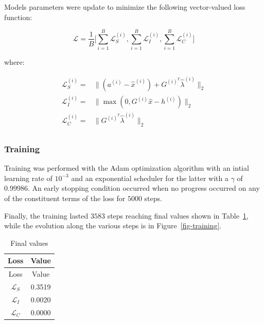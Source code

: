 \documentclass[
]{article}
\begin{document}
Models parameters were update to minimize the following vector-valued
loss function:

\begin{equation}
\mathcal{L} = \frac{1}{B}\biggr[\sum_{i=1}^B\mathcal{L}_{S}^{(i)}, \sum_{i=1}^B\mathcal{L}_{I}^{(i)}, \sum_{i=1}^B\mathcal{L}_{C}^{(i)}\biggr] 
\end{equation}

where:

\begin{align}
    \mathcal{L}_S^{(i)} =& \|(a^{(i)}-\hat{x}^{(i)}) + G^{(i)^{T}}\hat\lambda^{(i)}\|_2\\ 
    \mathcal{L}_{I}^{(i)}  =& \|\max(0, G^{(i)}\hat{x} - h^{(i)})\|_2\\
    \mathcal{L}_{C}^{(i)}  =& \|G^{(i)^{T}}\hat\lambda^{(i)}\|_2\\
\end{align}

\subsubsection{Training}\label{training}

Training was performed with the Adam optimization algorithm with an
intial learning rate of \(10^{-3}\) and an exponential scheduler for the
latter with a \(\gamma\) of \(0.99986\). An early stopping condition
occurred when no progress occurred on any of the constituent terms of
the loss for \(5000\) steps.

Finally, the training lasted \(3583\) steps reaching final values shown
in Table~\ref{tbl-training}, while the evolution along the various steps
is in Figure~\ref{fig-training}.

\begin{longtable}[]{@{}cc@{}}
\caption{Final values}\label{tbl-training}\tabularnewline
\toprule\noalign{}
Loss & Value \\
\midrule\noalign{}
\endfirsthead
\toprule\noalign{}
Loss & Value \\
\midrule\noalign{}
\endhead
\bottomrule\noalign{}
\endlastfoot
\(\mathcal{L}_S\) & 0.3519 \\
\(\mathcal{L}_I\) & 0.0020 \\
\(\mathcal{L}_C\) & 0.0000 \\
\end{longtable}
\end{document}
